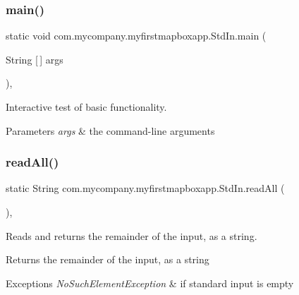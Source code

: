 \subsubsection{\texorpdfstring{main()}{main()}}
{\footnotesize\ttfamily static void com.\+mycompany.\+myfirstmapboxapp.\+Std\+In.\+main (\begin{DoxyParamCaption}\item[{String \mbox{[}$\,$\mbox{]}}]{args }\end{DoxyParamCaption})\hspace{0.3cm}{\ttfamily [inline]}, {\ttfamily [static]}}

Interactive test of basic functionality.


\begin{DoxyParams}{Parameters}
{\em args} & the command-\/line arguments \\
\hline
\end{DoxyParams}
\mbox{\label{classcom_1_1mycompany_1_1myfirstmapboxapp_1_1_std_in_ab88a5cfd29a5481fc1c3dc3a5ba72404}} 
\subsubsection{\texorpdfstring{read\+All()}{readAll()}}
{\footnotesize\ttfamily static String com.\+mycompany.\+myfirstmapboxapp.\+Std\+In.\+read\+All (\begin{DoxyParamCaption}{ }\end{DoxyParamCaption})\hspace{0.3cm}{\ttfamily [inline]}, {\ttfamily [static]}}

Reads and returns the remainder of the input, as a string.

\begin{DoxyReturn}{Returns}
the remainder of the input, as a string 
\end{DoxyReturn}

\begin{DoxyExceptions}{Exceptions}
{\em No\+Such\+Element\+Exception} & if standard input is empty \\
\hline
\end{DoxyExceptions}
\mbox{\label{classcom_1_1mycompany_1_1myfirstmapboxapp_1_1_std_in_add964ffde2d8786735e76b251407e34c}} 
